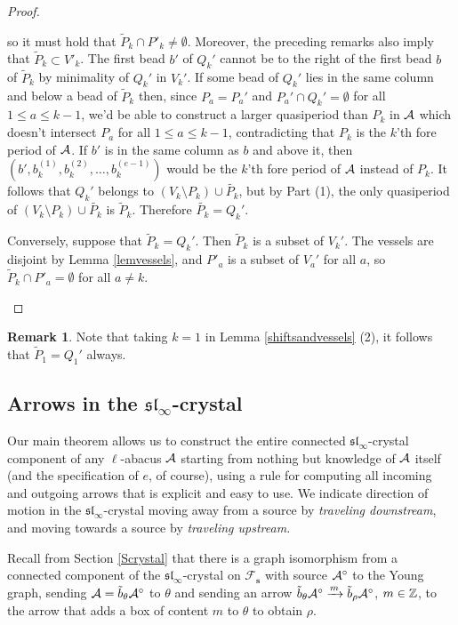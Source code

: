 \documentclass[12pt]{amsart}
\numberwithin{equation}{section}
\theoremstyle{definition}
\newtheorem{remark}[equation]{Remark}
\newcommand{\emp}{\emptyset}
\newcommand{\slinf}{\mathfrak{sl}_\infty}
\newcommand{\mbs}{\mathbf{s}}
\begin{document}
\begin{proof}
\begin{enumerate}
so it must hold that $\tilde{P}_k\cap P'_k\neq\emp$. Moreover, the preceding remarks also imply that $\tilde{P}_k\subset V'_k$. The first bead $b'$ of $Q_k'$ cannot be to the right of the first bead $b$ of $\tilde{P}_k$ by minimality of $Q_k'$ in $V_k'$. If some bead of $Q_k'$ lies in the same column and below a bead of $\tilde{P}_k$ then, since $P_a=P_a'$ and $P_a'\cap Q_k'=\emp$ for all $1\leq a\leq k-1$, we'd be able to construct a larger quasiperiod than $P_k$ in $\mathcal{A}$ which doesn't intersect $P_a$ for all $1\leq a\leq k-1$, contradicting that $P_k$ is the $k$'th fore period of $\mathcal{A}$. If $b'$ is in the same column as $b$ and above it, then $(b',b_k^{(1)},b_k^{(2)},\dots,b_k^{(e-1)})$ would be the $k$'th fore period of $\mathcal{A}$ instead of $P_k$. It follows that $Q_k'$ belongs to $(V_k\setminus P_k)\cup \tilde{P_k}$, but by Part (1), the only quasiperiod of $(V_k\setminus P_k)\cup \tilde{P_k}$ is $\tilde{P}_k$. Therefore $\tilde{P_k}= Q_k'$.

Conversely, suppose that $\tilde{P}_k=Q_k'$. 
Then $\tilde{P}_k$ is a subset of $V_k'$. 
The vessels are disjoint by Lemma \ref{lemvessels}, and $P'_a$ is a subset of $V_a'$ for all $a$, 
so $\tilde{P}_k\cap P'_a=\emp$ for all $a\neq k$.
\end{enumerate}

\end{proof}

\begin{remark} Note that taking $k=1$ in Lemma \ref{shiftsandvessels} (2), it follows that $\tilde{P}_1=Q_1'$ always.
\end{remark}


\subsection{Arrows in the $\slinf$-crystal}\label{subsectionedge} 
Our main theorem allows us to 
construct
the entire connected $\slinf$-crystal component of any $\ell$-abacus $\mathcal{A}$ starting from nothing but knowledge of $\mathcal{A}$ itself (and the specification of $e$, of course), using a rule 
for computing all incoming and outgoing arrows
that is explicit and easy to use. %
We indicate direction of motion in the $\slinf$-crystal moving away from a source by \textit{traveling downstream}, and moving towards a source by \textit{traveling upstream.}


Recall from Section \ref{Scrystal} that there is a graph isomorphism 
from a connected component of the $\slinf$-crystal on $\mathcal{F}_\mbs$ with source $\mathcal{A}^\circ$ to the Young graph, sending $\mathcal{A}=\tilde{b}_\theta\mathcal{A}^\circ$ to $\theta$ and sending an arrow $\tilde{b}_\theta\mathcal{A}^\circ\xrightarrow{m}\tilde{b}_\rho\mathcal{A}^\circ$, $m\in\mathbb{Z}$, to the arrow that adds a box of content $m$ to $\theta$ to obtain $\rho$. 
\end{document}
